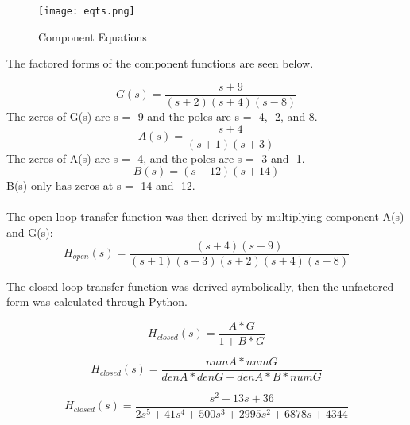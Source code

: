 \documentclass[12pt]{report}
\begin{document}
\begin{figure}[htp]
    \centering
    \texttt{[image: eqts.png]}
    \caption{Component Equations}
\end{figure}

The factored forms of the component functions are seen below.

\begin{equation*}
    G(s) = \frac{s+9}{(s+2)(s+4)(s-8)}
\end{equation*}
The zeros of G(s) are s = -9 and the poles are s = -4, -2, and 8.
\begin{equation*}
    A(s) = \frac{s+4}{(s+1)(s+3)}
\end{equation*}
The zeros of A(s) are s = -4, and the poles are s = -3 and -1.
\begin{equation*}
    B(s) = (s+12)(s+14)
\end{equation*}
B(s) only has zeros at s = -14 and -12.\\ \\
The open-loop transfer function was then derived by multiplying component A(s) and G(s):
\begin{equation*}
H_{open}(s) = \frac{(s+4)(s+9)}{(s+1)(s+3)(s+2)(s+4)(s-8)}
\end{equation*}

The closed-loop transfer function was derived symbolically, then the unfactored form was calculated through Python.

\begin{equation*}
H_{closed}(s) = \frac{A*G}{1+B*G}
\end{equation*}

\begin{equation*}
H_{closed}(s) = \frac{numA*numG}{denA*denG+denA*B*numG}
\end{equation*}

\begin{equation*}
H_{closed}(s) = \frac{s^2+13s+36}{2s^5+41s^4+500s^3+2995s^2+6878s+4344}
\end{equation*}
\end{document}
